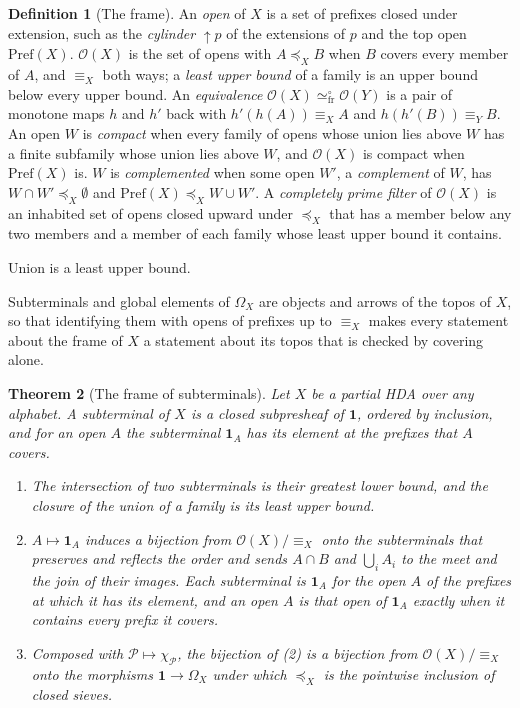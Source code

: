 \documentclass{lmcs}
\newtheorem{theorem}{Theorem}[section]
\theoremstyle{definition}
\newtheorem{definition}[theorem]{Definition}
\theoremstyle{remark}
\newcommand{\Op}{\mathcal{O}}
\newcommand{\sbt}[1]{\mathbf{1}_{#1}}
\newcommand{\Pref}{\mathrm{Pref}}
\newcommand{\fle}[1]{\preceq_{#1}}
\newcommand{\feq}[1]{\equiv_{#1}}
\newcommand{\upc}[1]{{\uparrow}#1}
\newcommand{\eqFrF}{\simeq^{\circ}_{\mathrm{fr}}}
\begin{document}
\begin{definition}[The frame]\label{def:frame}
An \emph{open} of $X$ is a set of prefixes closed under extension, such as the \emph{cylinder} $\upc{p}$ of the extensions of $p$
and the top open $\Pref(X)$.
$\Op(X)$ is the set of opens with $A\fle{X}B$ when $B$ covers every member of $A$, and $\feq{X}$ both ways; a
\emph{least upper bound} of a family is an upper bound below every upper bound. An \emph{equivalence}
$\Op(X)\eqFrF\Op(Y)$ is a pair of monotone maps $h$ and $h'$ back with $h'(h(A))\feq{X}A$ and
$h(h'(B))\feq{Y}B$. An open $W$ is \emph{compact} when every family of opens whose union lies above $W$ has a finite
subfamily whose union lies above $W$, and $\Op(X)$ is compact when $\Pref(X)$ is. $W$ is \emph{complemented} when
some open $W'$, a \emph{complement} of $W$, has $W\cap W'\fle{X}\emptyset$ and $\Pref(X)\fle{X}W\cup W'$. A
\emph{completely prime filter} of $\Op(X)$ is an inhabited set of opens closed upward under $\fle{X}$ that has a
member below any two members and a member of each family whose least upper bound it contains.
\end{definition}

Union is a least upper bound.

Subterminals and global elements of $\Omega_X$ are objects and arrows of the topos of $X$, so that identifying
them with opens of prefixes up to $\feq{X}$ makes every statement about the frame of $X$ a statement about its topos
that is checked by covering alone.

\begin{theorem}[The frame of subterminals]\label{thm:frame-sub}
Let $X$ be a partial HDA over any alphabet. A \emph{subterminal} of $X$ is a closed subpresheaf of $\mathbf{1}$, ordered
by inclusion, and for an open $A$ the subterminal $\sbt{A}$ has its element at the prefixes that $A$ covers.
\begin{enumerate}
\item The intersection of two subterminals is their greatest lower bound, and the closure of the union of a family
  is its least upper bound.
\item $A\mapsto\sbt{A}$ induces a bijection from $\Op(X)/{\feq{X}}$ onto the subterminals that preserves and
  reflects the order and sends $A\cap B$ and $\bigcup_i A_i$ to the meet and the join of their
  images. Each subterminal is $\sbt{A}$ for the open $A$ of the prefixes
  at which it has its element, and an open $A$ is that open of $\sbt{A}$ exactly when it
  contains every prefix it covers.
\item Composed with $\mathscr{P}\mapsto\chi_{\mathscr{P}}$, the bijection of (2) is a bijection from
  $\Op(X)/{\feq{X}}$ onto the morphisms $\mathbf{1}\to\Omega_X$ under which $\fle{X}$ is the pointwise inclusion of
  closed sieves.
\end{enumerate}
\end{theorem}
\end{document}
